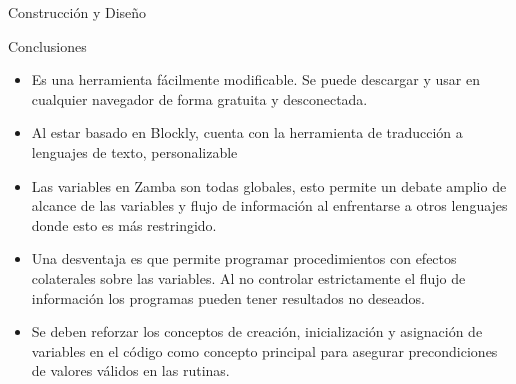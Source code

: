 \documentclass[final]{beamer}
\newlength{\twocolwid}
\begin{document}
\begin{frame}[t]
\begin{columns}[t]
\begin{column}{\twocolwid}
\begin{block}{Construcción y Diseño}
\begin{enumerate}
    \end{enumerate}

\end{block}



\begin{block}{Conclusiones}
    \begin{itemize}
        \item Es una herramienta fácilmente modificable. Se puede descargar y usar en cualquier navegador de forma gratuita y desconectada.
        \item Al estar basado en Blockly, cuenta con la herramienta de traducción a lenguajes de texto, personalizable
        \item Las variables en Zamba son todas globales, esto permite un debate amplio de alcance de las variables y flujo de información al enfrentarse a otros lenguajes donde esto es más restringido.
        \item Una desventaja es que permite programar procedimientos con efectos colaterales sobre las variables. Al no controlar estrictamente el flujo de información los programas pueden tener resultados no deseados.
        \item Se deben reforzar los conceptos de creación, inicialización y asignación de variables en el código como concepto principal para asegurar precondiciones de valores válidos en las rutinas.
    \end{itemize}
\end{block}


\end{column}
\end{columns}
\end{frame}
\end{document}
